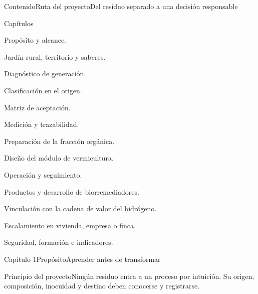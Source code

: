 \documentclass{../plantilla/hvtbook}
\begin{document}
\HVTMakeTitle

\begin{HVTPage}{Contenido}{Ruta del proyecto}{Del residuo separado a una decisión responsable}
\begin{HVTTaskOrdered}{Capítulos}
\item Propósito y alcance. \item Jardín rural, territorio y saberes. \item Diagnóstico de generación. \item Clasificación en el origen. \item Matriz de aceptación. \item Medición y trazabilidad. \item Preparación de la fracción orgánica. \item Diseño del módulo de vermicultura. \item Operación y seguimiento. \item Productos y desarrollo de biorremediadores. \item Vinculación con la cadena de valor del hidrógeno. \item Escalamiento en vivienda, empresa o finca. \item Seguridad, formación e indicadores.
\end{HVTTaskOrdered}
\end{HVTPage}

\begin{HVTPage}{Capítulo 1}{Propósito}{Aprender antes de transformar}
\begin{HVTFlow}
\end{HVTFlow}
\begin{HVTWarning}{Principio del proyecto}Ningún residuo entra a un proceso por intuición. Su origen, composición, inocuidad y destino deben conocerse y registrarse.\end{HVTWarning}
\end{HVTPage}
\end{document}
